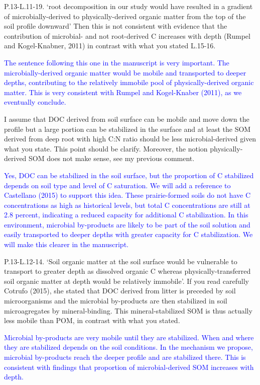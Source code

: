 \documentclass[]{article}
\begin{document}
P.13-L.11-19. `root decomposition in our study would have resulted in a
gradient of microbially-derived to physically-derived organic matter
from the top of the soil profile downward' Then this is not consistent
with evidence that the contribution of microbial- and not root-derived C
increases with depth (Rumpel and Kogel-Knabner, 2011) in contrast with
what you stated L.15-16.

\textcolor{blue}{The sentence following this one in the manuscript is very important. The microbially-derived organic matter would be mobile and transported to deeper depths, contributing to the relatively immobile pool of physically-derived organic matter. This is very consistent with Rumpel and Kogel-Knaber (2011), as we eventually conclude.}

I assume that DOC derived from soil surface can be mobile and move down
the profile but a large portion can be stabilized in the surface and at
least the SOM derived from deep root with high C:N ratio should be less
microbial-derived given what you state. This point should be clarify.
Moreover, the notion physically-derived SOM does not make sense, see my
previous comment.

\textcolor{blue}{Yes, DOC can be stabilized in the soil surface, but the proportion of C stabilized depends on soil type and level of C saturation. We will add a reference to Castellano (2015) to support this idea. These prairie-formed soils do not have C concentrations as high as historical levels, but total C concentrations are still at 2.8 percent, indicating a reduced capacity for additional C stabilization. In this environment, microbial by-products are likely to be part of the soil solution and easily transported to deeper depths with greater capacity for C stabilization. We will make this clearer in the manuscript.}

P.13-L.12-14. `Soil organic matter at the soil surface would be
vulnerable to transport to greater depth as dissolved organic C whereas
physically-transferred soil organic matter at depth would be relatively
immobile'. If you read carefully Cotrufo (2015), she stated that DOC
derived from litter is preceded by soil microorganisms and the microbial
by-products are then stabilized in soil microagregates by
mineral-binding. This mineral-stabilized SOM is thus actually less
mobile than POM, in contrast with what you stated.

\textcolor{blue}{Microbial by-products are very mobile until they are stabilized. When and where they are stabilized depends on the soil conditions. In the mechanism we propose, microbial by-products reach the deeper profile and are stabilized there. This is consistent with findings that proportion of microbial-derived SOM increases with depth.}
\end{document}
